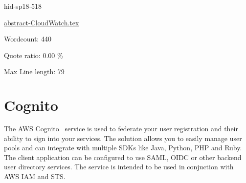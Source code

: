 \begin{IU}

hid-sp18-518

\href{https://github.com/cloudmesh-community/hid-sp18-518/blob/master//technology/abstract-CloudWatch.tex}{abstract-CloudWatch.tex}

 

Wordcount: 440


Quote ratio: 0.00 \%
 
Max Line length: 79
\end{IU}

\section{Cognito}

The AWS Cognito~\cite{hid-sp18-518-Cognito} service is used to federate your
user registration and their ability to sign into your services. The solution
allows you to easily manage user pools and can integrate with multiple SDKs 
like Java, Python, PHP and Ruby. The client application can be configured to
use SAML, OIDC or other backend user directory services. The service is 
intended to be used in conjuction with AWS IAM and STS.








